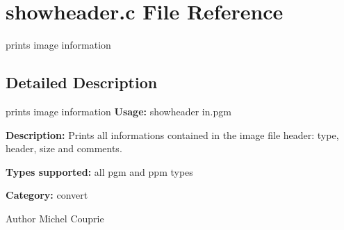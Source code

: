 \section{showheader.c File Reference}
\label{showheader_8c}


prints image information  




\subsection{Detailed Description}
prints image information {\bfseries Usage:} showheader in.pgm

{\bfseries Description:} Prints all informations contained in the image file header: type, header, size and comments.

{\bfseries Types supported:} all pgm and ppm types

{\bfseries Category:} convert

\begin{DoxyAuthor}{Author}
Michel Couprie 
\end{DoxyAuthor}
